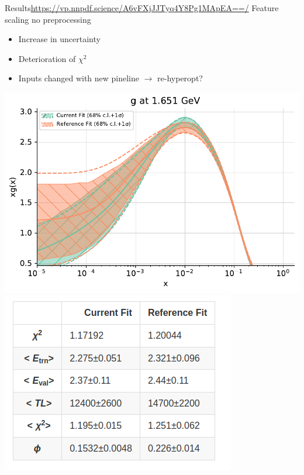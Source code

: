\documentclass[aspectratio=169, 8pt,t]{beamer}
\begin{document}
\begin{frame}{Results}{\url{https://vp.nnpdf.science/A6vFXjJJTyq4Y8Pg1MApEA==/}}
  Feature scaling no preprocessing
  \begin{itemize}
    \item Increase in uncertainty
    \item Deterioration of $\chi^2$
    \item Inputs changed with new pineline $\rightarrow$ re-hyperopt?
  \end{itemize}
  \begin{center}
    \includegraphics[height=0.5\textheight]{pdf_nopreproc_feature.pdf}
    \includegraphics[height=0.5\textheight]{nopreproc_feature_summary.png} \\
  \end{center}
\end{frame}
\end{document}
